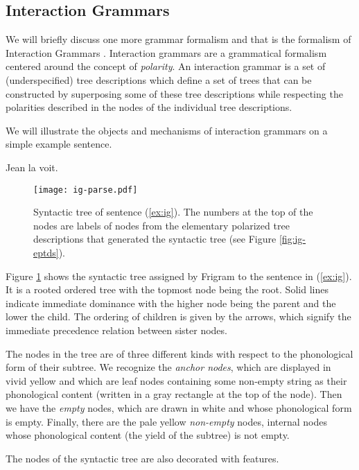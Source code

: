 \subsection{Interaction Grammars}

We will briefly discuss one more grammar formalism and that is the
formalism of Interaction Grammars \cite{guillaume2009interaction}.
Interaction grammars are a grammatical formalism centered around the
concept of \emph{polarity}. An interaction grammar is a set of
(underspecified) tree descriptions which define a set of trees that can
be constructed by superposing some of these tree descriptions while
respecting the polarities described in the nodes of the individual tree
descriptions.

We will illustrate the objects and mechanisms of interaction grammars on
a simple example sentence.

\begin{exe}
  \ex \label{ex:ig} Jean la voit.
\end{exe}

\begin{figure}
  \centering
  \texttt{[image: ig-parse.pdf]}
  \caption{\label{fig:ig-parse} Syntactic tree of sentence
    (\ref{ex:ig}). The numbers at the top of the nodes are labels of
    nodes from the elementary polarized tree descriptions that generated
    the syntactic tree (see Figure \ref{fig:ig-eptds}).}
\end{figure}

Figure \ref{fig:ig-parse} shows the syntactic tree assigned by Frigram
to the sentence in (\ref{ex:ig}). It is a rooted ordered tree with the
topmost node being the root. Solid lines indicate immediate dominance
with the higher node being the parent and the lower the child. The
ordering of children is given by the arrows, which signify the immediate
precedence relation between sister nodes.

The nodes in the tree are of three different kinds with respect to the
phonological form of their subtree. We recognize the \emph{anchor
  nodes}, which are displayed in vivid yellow and which are leaf nodes
containing some non-empty string as their phonological content (written
in a gray rectangle at the top of the node). Then we have the
\emph{empty} nodes, which are drawn in white and whose phonological form
is empty. Finally, there are the pale yellow \emph{non-empty} nodes,
internal nodes whose phonological content (the yield of the subtree) is
not empty.

The nodes of the syntactic tree are also decorated with
features.

